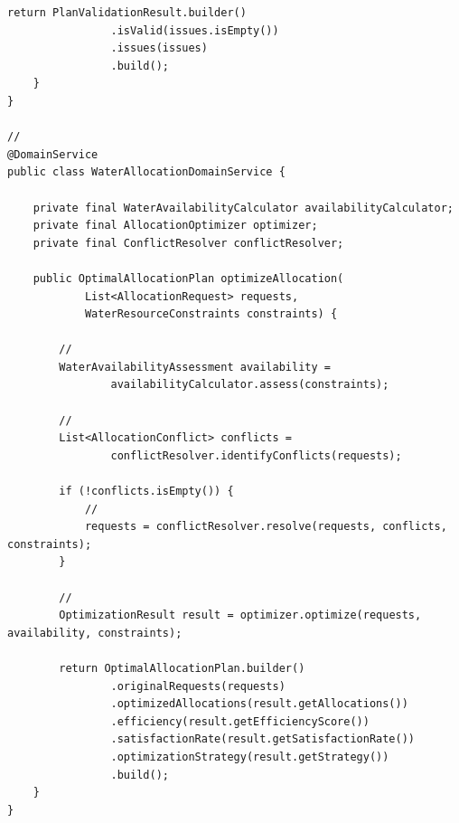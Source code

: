 \begin{lstlisting}[style=java]
        return PlanValidationResult.builder()
                .isValid(issues.isEmpty())
                .issues(issues)
                .build();
    }
}

// 
@DomainService
public class WaterAllocationDomainService {
    
    private final WaterAvailabilityCalculator availabilityCalculator;
    private final AllocationOptimizer optimizer;
    private final ConflictResolver conflictResolver;
    
    public OptimalAllocationPlan optimizeAllocation(
            List<AllocationRequest> requests, 
            WaterResourceConstraints constraints) {
        
        // 
        WaterAvailabilityAssessment availability = 
                availabilityCalculator.assess(constraints);
        
        // 
        List<AllocationConflict> conflicts = 
                conflictResolver.identifyConflicts(requests);
        
        if (!conflicts.isEmpty()) {
            // 
            requests = conflictResolver.resolve(requests, conflicts, constraints);
        }
        
        // 
        OptimizationResult result = optimizer.optimize(requests, availability, constraints);
        
        return OptimalAllocationPlan.builder()
                .originalRequests(requests)
                .optimizedAllocations(result.getAllocations())
                .efficiency(result.getEfficiencyScore())
                .satisfactionRate(result.getSatisfactionRate())
                .optimizationStrategy(result.getStrategy())
                .build();
    }
}
\end{lstlisting}

\hypertarget{section-76}{%
\subsubsection{}\label{section-76}}

